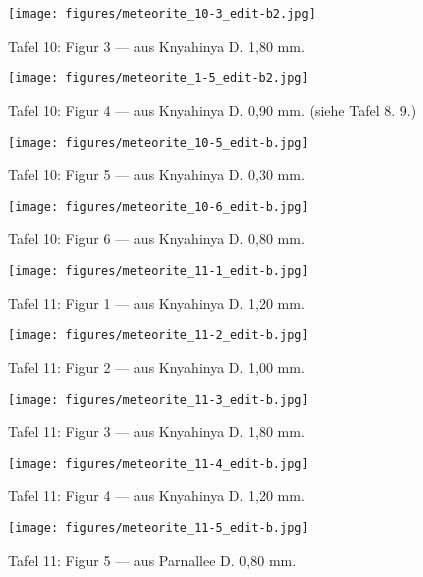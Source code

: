 \documentclass[a4paper, 11pt, oneside]{article}
\begin{document}
\clearpage
\begin{figure}[t]
\texttt{[image: figures/meteorite\_10-3\_edit-b2.jpg]}
\caption{Tafel 10: Figur 3 --- aus Knyahinya D. 1,80 mm.}
\centering
\end{figure}
\clearpage
\begin{figure}[t]
\texttt{[image: figures/meteorite\_1-5\_edit-b2.jpg]}
\caption{Tafel 10: Figur 4 --- aus Knyahinya D. 0,90 mm. (siehe Tafel 8. 9.)}
\centering
\end{figure}
\clearpage
\begin{figure}[t]
\texttt{[image: figures/meteorite\_10-5\_edit-b.jpg]}
\caption{Tafel 10: Figur 5 --- aus Knyahinya D. 0,30 mm.}
\centering
\end{figure}
\clearpage
\begin{figure}[t]
\texttt{[image: figures/meteorite\_10-6\_edit-b.jpg]}
\caption{Tafel 10: Figur 6 --- aus Knyahinya D. 0,80 mm.}
\centering
\end{figure}
\clearpage
{}
\begin{figure}[t]
\texttt{[image: figures/meteorite\_11-1\_edit-b.jpg]}
\caption{Tafel 11: Figur 1 --- aus Knyahinya D. 1,20 mm.}
\centering
\end{figure}
\clearpage
\begin{figure}[t]
\texttt{[image: figures/meteorite\_11-2\_edit-b.jpg]}
\caption{Tafel 11: Figur 2 --- aus Knyahinya D. 1,00 mm.}
\centering
\end{figure}
\clearpage
\begin{figure}[t]
\texttt{[image: figures/meteorite\_11-3\_edit-b.jpg]}
\caption{Tafel 11: Figur 3 --- aus Knyahinya D. 1,80 mm.}
\centering
\end{figure}
\clearpage
\begin{figure}[t]
\texttt{[image: figures/meteorite\_11-4\_edit-b.jpg]}
\caption{Tafel 11: Figur 4 --- aus Knyahinya D. 1,20 mm.}
\centering
\end{figure}
\clearpage
\begin{figure}[t]
\texttt{[image: figures/meteorite\_11-5\_edit-b.jpg]}
\caption{Tafel 11: Figur 5 --- aus Parnallee D. 0,80 mm.}
\centering
\end{figure}
\end{document}
